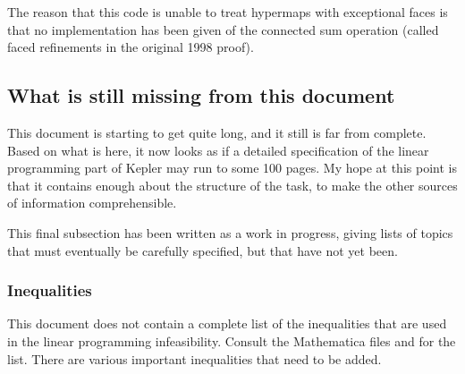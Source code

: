 The reason that this code is unable to treat hypermaps with
exceptional faces is that no implementation has been given of the
connected sum operation (called faced refinements in the original 1998
proof).


\subsection {What is still missing from this document}

This document is starting to get quite long, and it still is far
from complete.  Based on what is here, it now looks as if a
detailed specification of the linear programming part of Kepler
may run to some 100 pages. My hope at this point is that it
contains enough about the structure of the task, to make the other
sources of information comprehensible.

This final subsection has been written as a work in progress,
giving lists of topics that must eventually be carefully
specified, but that have not yet been.

\subsubsection{Inequalities}

This document does not contain a complete list of the inequalities
that are used in the linear programming infeasibility.  Consult
the Mathematica files and \cite{DCG} for the list.  There are
various important inequalities that need to be added.

